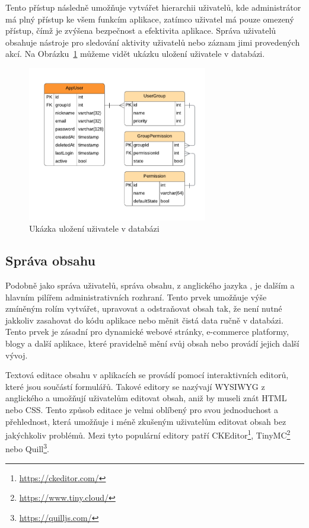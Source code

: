 Tento přístup následně umožňuje vytvářet hierarchii uživatelů, kde administrátor má plný přístup ke všem funkcím aplikace, zatímco uživatel má pouze omezený přístup, čímž je zvýšena bezpečnost a efektivita aplikace. Správa uživatelů obsahuje nástroje pro sledování aktivity uživatelů nebo záznam jimi provedených akcí. Na Obrázku~\ref{fig:user-management} můžeme vidět ukázku uložení uživatele v databázi.

\begin{figure}[H]
    \centering
    \includegraphics[width=0.7\textwidth]{diagrams/userManagement}
    \caption{Ukázka uložení uživatele v databázi \cite{responsive_design}}
    \label{fig:user-management}
\end{figure}

\subsection{Správa obsahu}
\label{subsec:admin-elements-content-management}
Podobně jako správa uživatelů, správa obsahu, z anglického jazyka \textit{}, je dalším a hlavním pilířem administrativních rozhraní. Tento prvek umožňuje výše zmíněným rolím vytvářet, upravovat a odstraňovat obsah tak, že není nutné jakkoliv zasahovat do kódu aplikace nebo měnit čistá data ručně v databázi. Tento prvek je zásadní pro dynamické webové stránky, e-commerce platformy, blogy a další aplikace, které pravidelně mění svůj obsah nebo provádí jejich další vývoj.

Textová editace obsahu v aplikacích se provádí pomocí interaktivních editorů, které jsou součástí formulářů. Takové editory se nazývají WYSIWYG z anglického \textit{} a umožňují uživatelům editovat obsah, aniž by museli znát HTML nebo CSS. Tento způsob editace je velmi oblíbený pro svou jednoduchost a přehlednost, která umožňuje i méně zkušeným uživatelům editovat obsah bez jakýchkoliv problémů. Mezi tyto populární editory patří CKEditor\footnote[1]{\url{https://ckeditor.com/}}, TinyMC\footnote[2]{\url{https://www.tiny.cloud/}} nebo Quill\footnote[3]{\url{https://quilljs.com/}}.

